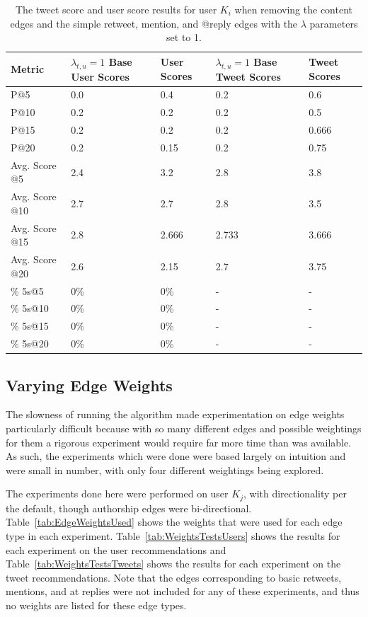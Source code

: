 \begin{table}
\centering
\begin{tabular}{l|p{2cm}|p{2cm}|p{2cm}|p{2cm}}
{\bf Metric} & {\bf $\lambda_{t,u}=1$ Base User Scores} & {\bf User Scores} & {\bf $\lambda_{t,u}=1$ Base Tweet Scores} & {\bf Tweet Scores} \\ \hline
P@5   & 0.0 & 0.4 & 0.2 & 0.6 \\ \hline
P@10 & 0.2 & 0.2 & 0.2 & 0.5 \\ \hline
P@15 & 0.2 & 0.2 & 0.2 & 0.666 \\ \hline
P@20 & 0.2 & 0.15 & 0.2 & 0.75 \\ \hline

Avg. Score @5   & 2.4 & 3.2 & 2.8 & 3.8 \\ \hline
Avg. Score @10 & 2.7 & 2.7 & 2.8 & 3.5 \\ \hline
Avg. Score @15 & 2.8 & 2.666 & 2.733 & 3.666 \\ \hline
Avg. Score @20 & 2.6 & 2.15 & 2.7 & 3.75 \\ \hline

\% 5s@5    & 0\% & 0\% & - & - \\ \hline
\% 5s@10  & 0\% & 0\% & - & - \\ \hline
\% 5s@15  & 0\% & 0\% & - & - \\ \hline
\% 5s@20  & 0\% & 0\% & - & - \\

\end{tabular}
\caption[Results from removing content edges and retweet, mention, and @reply edges]{The tweet score and user score results for user $K_{i}$ when removing the content edges and the simple retweet, mention, and @reply edges with the $\lambda$ parameters set to 1.}
\label{tab:RemoveContentAnd369LambdasAt1}
\end{table}


\subsection{Varying Edge Weights}

The slowness of running the algorithm made experimentation on edge weights particularly difficult because with so many different edges and possible weightings for them a rigorous experiment would require far more time than was available. As such, the experiments which were done were based largely on intuition and were small in number, with only four different weightings being explored.

The experiments done here were performed on user $K_{j}$, with directionality per the default, though authorship edges were bi-directional. Table~\ref{tab:EdgeWeightsUsed} shows the weights that were used for each edge type in each experiment. Table~\ref{tab:WeightsTestsUsers} shows the results for each experiment on the user recommendations and Table~\ref{tab:WeightsTestsTweets} shows the results for each experiment on the tweet recommendations. Note that the edges corresponding to basic retweets, mentions, and at replies were not included for any of these experiments, and thus no weights are listed for these edge types.

